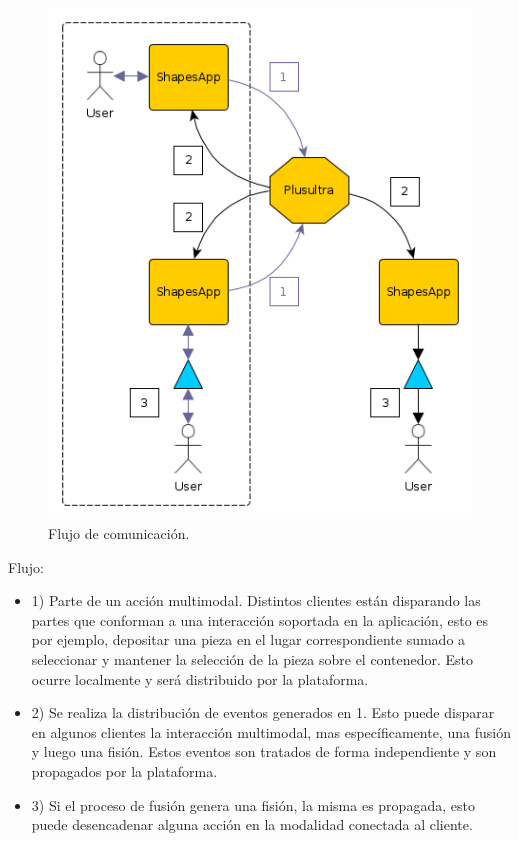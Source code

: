 \begin{center}
  \begin{figure}[h]
    \includegraphics[scale=0.7]{gfx/example_showcase}
    \caption{Flujo de comunicación.}
    \label{fig:demo_show_shapes}
  \end{figure}
\end{center}

Flujo:
\begin{itemize}

\item 1) Parte de un acción multimodal. Distintos clientes están disparando las partes que conforman a una interacción soportada en la aplicación, esto es por ejemplo, depositar una pieza en el lugar correspondiente sumado a seleccionar y mantener la selección de la pieza sobre el contenedor. Esto ocurre localmente y será distribuido por la plataforma.

\item 2) Se realiza la distribución de eventos generados en 1. Esto puede disparar en algunos clientes la interacción multimodal, mas específicamente, una fusión y luego una fisión. Estos eventos son tratados de forma independiente y son propagados por la plataforma. 

\item 3) Si el proceso de fusión genera una fisión, la misma es propagada, esto puede desencadenar alguna acción en la modalidad conectada al cliente.

\end{itemize}

